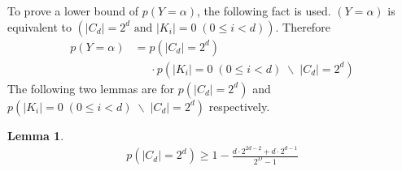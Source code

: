 \documentclass[10pt, conference, compsocconf]{IEEEtran}
\newtheorem{mylemma}{Lemma}
\begin{document}
        To prove a lower bound of $p(Y = \alpha)$, the following fact is used.
        $(Y = \alpha)$ is equivalent to $\left(|C_d| = 2^d \text{ and } |K_i| = 0   \; (0 \leq i < d)\right)$.
        Therefore
        \begin{align*}
            p(Y = \alpha) &= p(|C_d| = 2^d)\\
                & \;\;\;\;\; \cdot p(|K_i| = 0  \; (0 \leq i < d) \; \backslash \; |C_d| = 2^d)
        \end{align*}
        The following two lemmas are for $p(|C_d| = 2^d)$ and $p(|K_i| = 0  \; (0 \leq i < d) \; \backslash \; |C_d| = 2^d)$
        respectively.

        \begin{mylemma}
            \begin{align*}
                p(|C_d| = 2^d) \geq 1-\frac{d \cdot 2^{2d-2}+d \cdot 2^{d-1}}{2^D-1}
            \end{align*}
        \end{mylemma}
\end{document}
